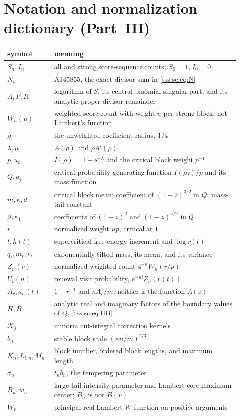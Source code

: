 \documentclass[11pt]{article}
\theoremstyle{remark}\newtheorem{remark}[theorem]{Remark}
\theoremstyle{definition}\newtheorem{definition}[theorem]{Definition}
\newcommand{\e}{\mathrm e}
\newcommand{\Kc}{\mathcal K}
\begin{document}
\section{Notation and normalization dictionary (Part~III)}
\label{tss:sc:app:notation}
\begin{longtable}{@{}p{0.18\linewidth}p{0.75\linewidth}@{}}
\toprule
symbol & meaning\\\midrule\endhead
$S_n,I_n$ & all and strong score-sequence counts; $S_0=1$, $I_0=0$\\
$N_n$ & A145855, the exact divisor sum in \eqref{tss:sc:eq:N}\\
$A,F,R$ & logarithm of $S$, its central-binomial singular part, and its analytic proper-divisor remainder\\
$W_n(u)$ & weighted score count with weight $u$ per strong block; not Lambert's function\\
$\rho$ & the unweighted coefficient radius, $1/4$\\
$\lambda,\mu$ & $A(\rho)$ and $\rho A'(\rho)$\\
$p,u_c$ & $I(\rho)=1-\e^{-\lambda}$ and the critical block weight $p^{-1}$\\
$Q,q_j$ & critical probability generating function $I(\rho z)/p$ and its mass function\\
$m,\kappa,d$ & critical block mean; coefficient of $(1-z)^{3/2}$ in $Q$; mass-tail constant\\
$\beta,\kappa_1$ & coefficients of $(1-z)^2$ and $(1-z)^{5/2}$ in $Q$\\
$r$ & normalized weight $up$, critical at $1$\\
$t,h(t)$ & supercritical free-energy increment and $\log r(t)$\\
$q_t,m_t,v_t$ & exponentially tilted mass, its mean, and its variance\\
$Z_n(r)$ & normalized weighted count $4^{-n}W_n(r/p)$\\
$U_t(n)$ & renewal visit probability, $\e^{-nt}Z_n(r(t))$\\
$A_r,a_n(t)$ & $1-r^{-1}$ and $nA_r/m$; neither is the function $A(z)$\\
$H,B$ & analytic real and imaginary factors of the boundary values of $Q$, \eqref{tss:sc:eq:HB}\\
$\Kc_j$ & uniform cut-integral correction kernels\\
$b_n$ & stable block scale $(\kappa n/m)^{2/3}$\\
$K_n,L_{i,n},M_n$ & block number, ordered block lengths, and maximum length\\
$\sigma_n$ & $t_nb_n$, the tempering parameter\\
$B_n,w_n$ & large-tail intensity parameter and Lambert-core maximum center; $B_n$ is not $B(v)$\\
$W_0$ & principal real Lambert-$W$ function on positive arguments\\
\bottomrule
\end{longtable}
\end{document}
